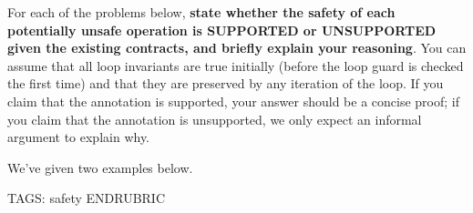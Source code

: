 For each of the problems below, \textbf{state whether the safety of each
  potentially unsafe operation is SUPPORTED or UNSUPPORTED given the existing
  contracts, and briefly explain your reasoning}.  You can assume that all
loop invariants are true initially (before the loop guard is checked the first
time) and that they are preserved by any iteration of the loop. If you claim
that the annotation is supported, your answer should be a concise proof; if you
claim that the annotation is unsupported, we only expect an informal argument
to explain why.

We've given two examples below.


\newpage


\begin{parts}

\newcommand{\aLine}[3][1.5ex]
{\stepcounter{lineCounter}%
 \noindent\makebox[1em]{\alph{lineCounter})~~}\uanswer{21em}{#2}\hfill~by
 \uanswer{10em}{#3\hfill}\\[#1]%
}%
\newcommand{\noans}[1]{\textbf{#1}}
\newcommand{\ans}[1]{%
  \ifprintanswers%
  \textcolor{\answerColor}{\fbox{\noans{#1}}}%
  \else\noans{#1}\fi}

\RUBRIC
TAGS: safety
ENDRUBRIC

\newpage %
\newpage %
\newpage %

\end{parts}
